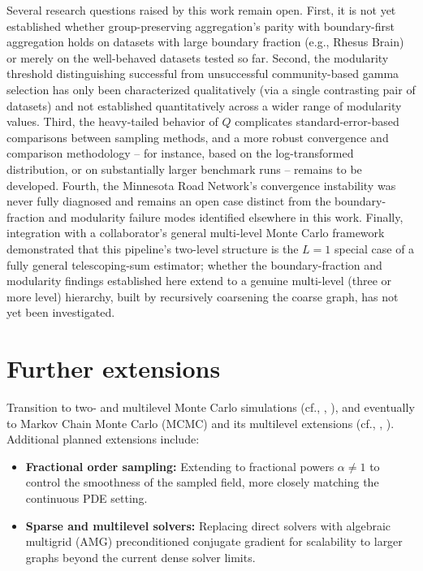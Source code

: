 \documentclass[a4paper,12pt]{amsart}
\numberwithin{equation}{section}
\begin{document}
Several research questions raised by this work remain open. First, it 
is not yet established whether group-preserving aggregation's parity 
with boundary-first aggregation holds on datasets with large boundary 
fraction (e.g., Rhesus Brain) or merely on the well-behaved datasets 
tested so far. Second, the modularity threshold distinguishing 
successful from unsuccessful community-based gamma selection has only 
been characterized qualitatively (via a single contrasting pair of 
datasets) and not established quantitatively across a wider range of 
modularity values. Third, the heavy-tailed behavior of $Q$ complicates 
standard-error-based comparisons between sampling methods, and a more 
robust convergence and comparison methodology -- for instance, based 
on the log-transformed distribution, or on substantially larger 
benchmark runs -- remains to be developed. Fourth, the Minnesota Road 
Network's convergence instability was never fully diagnosed and 
remains an open case distinct from the boundary-fraction and 
modularity failure modes identified elsewhere in this work. Finally, 
integration with a collaborator's general multi-level Monte Carlo 
framework demonstrated that this pipeline's two-level structure is the 
$L=1$ special case of a fully general telescoping-sum estimator; 
whether the boundary-fraction and modularity findings established here 
extend to a genuine multi-level (three or more level) hierarchy, built 
by recursively coarsening the coarse graph, has not yet been 
investigated.
\section{Further extensions}

Transition to two- and multilevel Monte Carlo simulations 
(cf., \citet{Cliffe11}, \citet{Osborn17, Osborn17b}), and eventually 
to Markov Chain Monte Carlo (MCMC) and its multilevel extensions 
(cf., \citet{Dodwell15}, \citet{fairbanks}). Additional planned 
extensions include:
\begin{itemize}
\item \textbf{Fractional order sampling:} Extending to fractional 
powers $\alpha \neq 1$ to control the smoothness of the sampled 
field, more closely matching the continuous PDE setting.
\item \textbf{Sparse and multilevel solvers:} Replacing direct 
solvers with algebraic multigrid (AMG) preconditioned conjugate 
gradient for scalability to larger graphs beyond the current 
dense solver limits.
\end{itemize}
\end{document}
